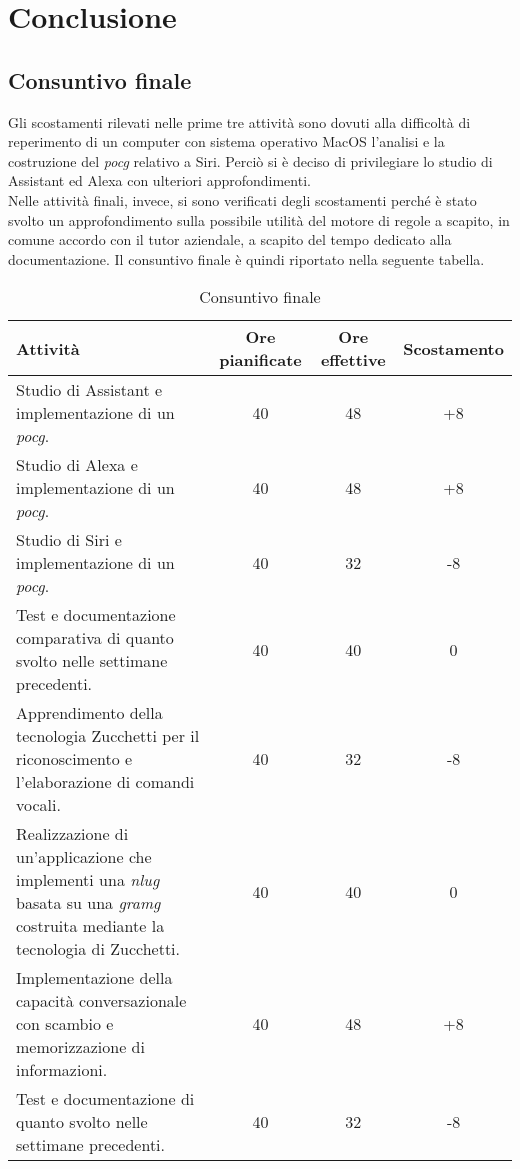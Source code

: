 
\chapter{Conclusione}
\label{cap:conclusione}


\section{Consuntivo finale}
Gli scostamenti rilevati nelle prime tre attività sono dovuti alla difficoltà di reperimento di un computer con sistema operativo MacOS l'analisi e la costruzione del \emph{\gls{pocg}} relativo a Siri. Perciò si è deciso di privilegiare lo studio di Assistant ed Alexa con ulteriori approfondimenti. \\
Nelle attività finali, invece, si sono verificati degli scostamenti perché è stato svolto un approfondimento sulla possibile utilità del motore di regole a scapito, in comune accordo con il tutor aziendale, a scapito del tempo dedicato alla documentazione.
Il consuntivo finale è quindi riportato nella seguente tabella.
\begin{table}
	\begin{tabularx}{\textwidth}{|X|c|c|c|}
		\hline
		\textbf{Attività} & \textbf{Ore pianificate} & \textbf{Ore effettive} & \textbf{Scostamento} \\
		\hline
		Studio di Assistant e implementazione di un \emph{\gls{pocg}}. & 40 & 48 & +8 \\
		\hline
		Studio di Alexa e implementazione di un \emph{\gls{pocg}}. & 40 & 48 & +8 \\
		\hline
		Studio di Siri e implementazione di un \emph{\gls{pocg}}. & 40 & 32 & -8 \\
		\hline
		Test e documentazione comparativa di quanto svolto nelle settimane precedenti. & 40 & 40 & 0 \\
		\hline
		Apprendimento della tecnologia Zucchetti per il riconoscimento e l'elaborazione di comandi vocali. & 40 & 32 & -8 \\
		\hline
		Realizzazione di un'applicazione che implementi una \emph{\gls{nlug}} basata su una \emph{\gls{gramg}} costruita mediante la tecnologia di Zucchetti. & 40 & 40 & 0 \\
		\hline
		Implementazione della capacità conversazionale con scambio e memorizzazione di informazioni. & 40 & 48 & +8 \\
		\hline
		Test e documentazione di quanto svolto nelle settimane precedenti. & 40 & 32 & -8 \\	
		\hline
	\end{tabularx}
	\caption{Consuntivo finale}
\end{table}
\pagebreak
